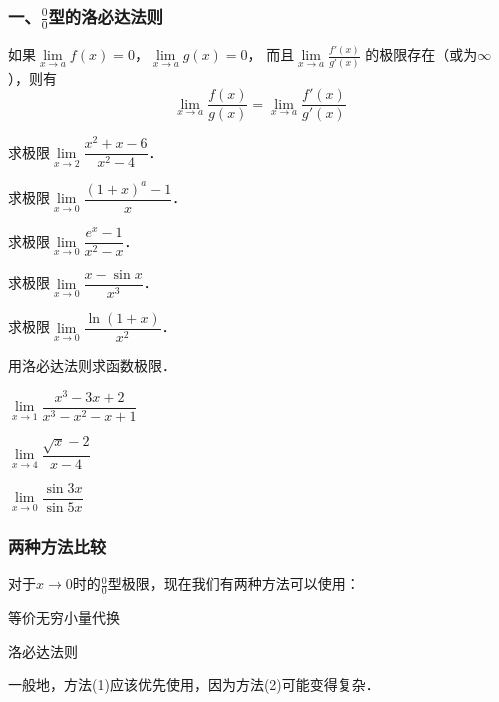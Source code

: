 \documentclass[14pt,notheorems,leqno,xcolor={rgb}]{beamer} %
\begin{document}
\begin{frame}
\frametitle{一、$\frac00$型的洛必达法则}
\begin{theorem}
如果$\lim\limits_{x\to a}f(x)=0$，$\lim\limits_{x\to a}g(x)=0$，
而且$\lim\limits_{x\to a}\frac{f'(x)}{g'(x)}$ 的极限存在（或为$\infty$），则有
\[\lim_{x\to a}\frac{f(x)}{g(x)}=\lim\limits_{x\to a}\frac{f'(x)}{g'(x)}\]
\end{theorem}\pause
\begin{example}
求极限$\lim\limits_{x\to2}\dfrac{x^2+x-6}{x^2-4}$．
\end{example}
\end{frame}

\begin{frame}
\begin{example}
求极限$\lim\limits_{x\to0}\dfrac{(1+x)^a-1}{x}$．
\end{example}\pause
\begin{example}
求极限$\lim\limits_{x\to0}\dfrac{e^x-1}{x^2-x}$．
\end{example}\pause
\begin{example}
求极限$\lim\limits_{x\to0}\dfrac{x-\sin x}{x^3}$．
\end{example}\pause
\begin{example}
求极限$\lim\limits_{x\to0}\dfrac{\ln(1+x)}{x^2}$．
\end{example}
\end{frame}

\begin{frame}
\begin{exercise}
用洛必达法则求函数极限．
\begin{enumlite}[<+->]
  \item $\lim\limits_{x\to1}\dfrac{x^3-3x+2}{x^3-x^2-x+1}$
  \item $\lim\limits_{x\to4}\dfrac{\sqrt{x}-2}{x-4}$
  \item $\lim\limits_{x\to0}\dfrac{\sin 3x}{\sin 5x}$
\end{enumlite}
\end{exercise}
\end{frame}

\begin{frame}
\frametitle{两种方法比较}
\begin{remark}
对于$x\to0$时的$\frac00$型极限，现在我们有两种方法可以使用：
\begin{enumskip}
  \item 等价无穷小量代换
  \item 洛必达法则
\end{enumskip}
一般地，方法(1)应该优先使用，因为方法(2)可能变得复杂．
\end{remark}
\end{frame}
\end{document}
